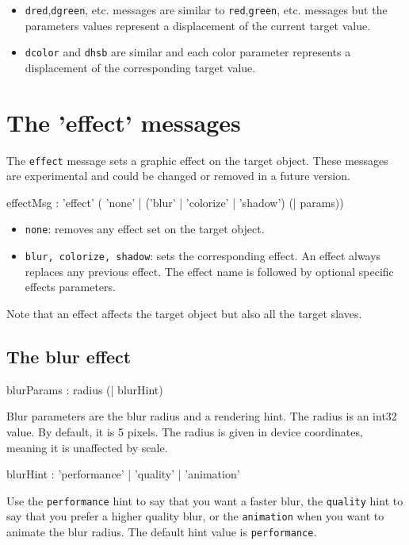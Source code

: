 \documentclass[a4paper,twoside]{report}
\newcommand{\sublevel}[1]	{\section{#1}}
\newcommand{\subsublevel}[1]	{\subsection{#1}}
\newcommand{\OSC}[1]		{\texttt{#1}}
\begin{document}
\begin{itemize}
\item \OSC{dred},\OSC{dgreen}, etc. messages are similar to \OSC{red},\OSC{green}, etc. messages but the parameters values represent a displacement of the current target value.
\item \OSC{dcolor} and \OSC{dhsb} are similar and each color parameter represents a displacement of the corresponding target value.
\end{itemize}


\sublevel{The 'effect' messages}
\label{effectmsg}

The \OSC{effect} message sets a graphic effect on the target object. These messages are experimental and could be changed or removed in a future version.

\begin{rail}
effectMsg : 'effect' ( 'none'
		| ('blur'
		| 'colorize'
		| 'shadow') (| params)) 		
\end{rail}

\begin{itemize}
\item \OSC{none}: removes any effect set on the target object.
\item \OSC{blur, colorize, shadow}: sets the corresponding effect. An effect always replaces any previous effect. The effect name is followed by optional specific effects parameters.
\end{itemize}

Note that an effect affects the target object but also all the target slaves.

\subsublevel{The blur effect}

\begin{rail}
blurParams : radius (| blurHint)
\end{rail}

Blur parameters are the blur radius and a rendering hint. The radius is an int32 value. By default, it is 5 pixels. The radius is given in device coordinates, meaning it is unaffected by scale. 

\begin{rail}
blurHint : 'performance' | 'quality' | 'animation'
\end{rail}
Use the \OSC{performance} hint to say that you want a faster blur, the \OSC{quality} hint to say that you prefer a higher quality blur, or the \OSC{animation} when you want to animate the blur radius. The default hint value is \OSC{performance}.
\end{document}
